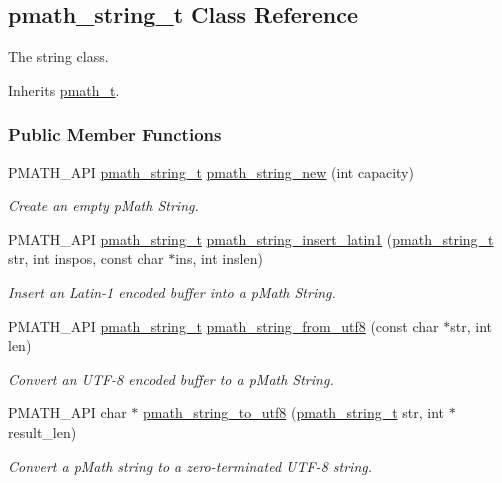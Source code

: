 \hypertarget{classpmath__string__t}{
\subsection{pmath\_\-string\_\-t Class Reference}
\label{classpmath__string__t}
}
The string class.  


Inherits \hyperlink{classpmath__t}{pmath\_\-t}.

\subsubsection*{Public Member Functions}
\begin{CompactItemize}
\item 
PMATH\_\-API \hyperlink{classpmath__string__t}{pmath\_\-string\_\-t} \hyperlink{group__strings_g9f860fe571fcb87515b82ddc704c93ef}{pmath\_\-string\_\-new} (int capacity)
\begin{CompactList}\small\item\em Create an empty pMath String. \item\end{CompactList}\item 
PMATH\_\-API \hyperlink{classpmath__string__t}{pmath\_\-string\_\-t} \hyperlink{group__strings_g0016e7daa5ca421a48b6d8bd3c5f7ff5}{pmath\_\-string\_\-insert\_\-latin1} (\hyperlink{classpmath__string__t}{pmath\_\-string\_\-t} str, int inspos, const char $\ast$ins, int inslen)
\begin{CompactList}\small\item\em Insert an Latin-1 encoded buffer into a pMath String. \item\end{CompactList}\item 
PMATH\_\-API \hyperlink{classpmath__string__t}{pmath\_\-string\_\-t} \hyperlink{group__strings_g0591f864ff17f7c27dc7b5032dab7551}{pmath\_\-string\_\-from\_\-utf8} (const char $\ast$str, int len)
\begin{CompactList}\small\item\em Convert an UTF-8 encoded buffer to a pMath String. \item\end{CompactList}\item 
PMATH\_\-API char $\ast$ \hyperlink{group__strings_g881c2e70d81dd43a79d5ccbecc933e79}{pmath\_\-string\_\-to\_\-utf8} (\hyperlink{classpmath__string__t}{pmath\_\-string\_\-t} str, int $\ast$result\_\-len)
\begin{CompactList}\small\item\em Convert a pMath string to a zero-terminated UTF-8 string. \item\end{CompactList}\item 

\end{CompactItemize}
